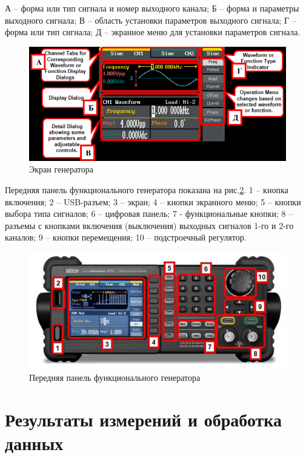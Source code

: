 \documentclass[a4paper,12pt]{article}
\begin{document}
А – форма или тип сигнала и номер выходного канала;
Б – форма и параметры выходного сигнала;
В – область установки параметров выходного сигнала;
Г – форма или тип сигнала;
Д – экранное меню для установки параметров сигнала.

\begin{figure}[h]
    \centering
    \includegraphics[width=0.8\linewidth]{pictures/generator1.png}
    \caption{Экран генератора}
    \label{pic:gen-1}
\end{figure}

Передняя панель функционального генератора показана на рис.\ref{pic:gen-2}. 1 – кнопка включения; 2 – USB-разъем; 3 – экран; 4 – кнопки экранного меню; 5 – кнопки выбора типа сигналов; 6 – цифровая панель; 7 - функциональные кнопки; 8 – разъемы с кнопками включения (выключения) выходных сигналов 1-го и 2-го каналов; 9 – кнопки перемещения; 10 – подстроечный регулятор.

\begin{figure}[h]
    \centering
    \includegraphics[width=0.9\linewidth]{pictures/generator2.png}
    \caption{Передняя панель функционального генератора}
    \label{pic:gen-2}
\end{figure}

\FloatBarrier

\section{Результаты измерений и обработка данных}
\end{document}
